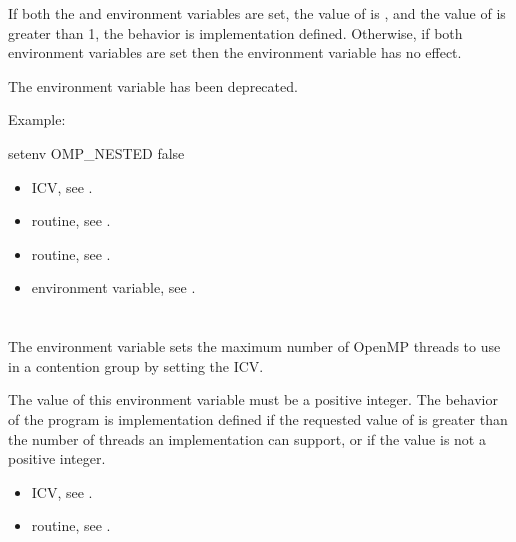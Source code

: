If both the  and  environment
variables are set, the value of  is , and
the value of  is greater than 1, the behavior is
implementation defined. Otherwise, if both environment variables are set then
the  environment variable has no effect.

The  environment variable has been deprecated.

Example:
\begin{ompEnv}
setenv OMP_NESTED false
\end{ompEnv}

\crossreferences
\begin{itemize}
\item {} ICV, see .

\item {} routine, see .

\item {} routine, see .

\item {} environment variable, 
see .
\end{itemize}



\section{}
\label{sec:OMP_THREAD_LIMIT}
The  environment variable sets the maximum number 
of OpenMP threads to use in a contention group by setting the 
 ICV.

The value of this environment variable must be a positive integer. The 
behavior of the program is implementation defined if the requested value 
of  is greater than the number of threads an 
implementation can support, or if the value is not a positive integer.

\crossreferences
\begin{itemize}
\item {} ICV, see .

\item {} routine, 
see .
\end{itemize}



